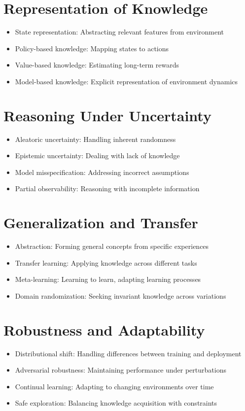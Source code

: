 \section{Representation of Knowledge}
\begin{itemize}
    \item State representation: Abstracting relevant features from environment
    \item Policy-based knowledge: Mapping states to actions
    \item Value-based knowledge: Estimating long-term rewards
    \item Model-based knowledge: Explicit representation of environment dynamics
\end{itemize}

\section{Reasoning Under Uncertainty}
\begin{itemize}
    \item Aleatoric uncertainty: Handling inherent randomness
    \item Epistemic uncertainty: Dealing with lack of knowledge
    \item Model misspecification: Addressing incorrect assumptions
    \item Partial observability: Reasoning with incomplete information
\end{itemize}

\section{Generalization and Transfer}
\begin{itemize}
    \item Abstraction: Forming general concepts from specific experiences
    \item Transfer learning: Applying knowledge across different tasks
    \item Meta-learning: Learning to learn, adapting learning processes
    \item Domain randomization: Seeking invariant knowledge across variations
\end{itemize}

\section{Robustness and Adaptability}
\begin{itemize}
    \item Distributional shift: Handling differences between training and deployment
    \item Adversarial robustness: Maintaining performance under perturbations
    \item Continual learning: Adapting to changing environments over time
    \item Safe exploration: Balancing knowledge acquisition with constraints
\end{itemize}

